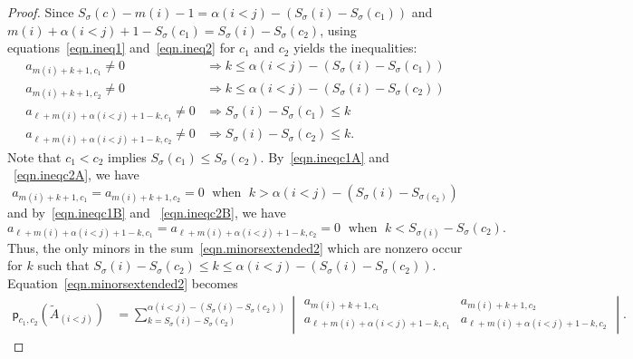 \documentclass[11pt]{amsart}
\theoremstyle{remark}
\theoremstyle{remark}
\theoremstyle{definition}
\theoremstyle{definition}
\theoremstyle{definition}
\numberwithin{equation}{section}
\newcommand{\gs}{\sigma}
\newcommand{\al}{\alpha}
\newcommand{\pl}{\mathsf{p}}
\newcommand{\mi}[1]{m(#1)}
\begin{document}
\begin{proof}
Since $S_\gs(c)-\mi{i}-1 = \al(i<j) - \left( S_\gs(i) - S_\gs(c_1) \right)$ and $\mi{i}+\al(i<j) +1 -S_\gs(c_1) = S_\gs(i)-S_{\gs}(c_2)$, using  equations~\eqref{eqn.ineq1} and~\eqref{eqn.ineq2} for $c_1$ and $c_2$ yields the inequalities:
\begin{align}
\label{eqn.ineqc1A} a_{\mi{i}+k+1, c_1} \neq 0 &\Rightarrow k \leq   \al(i<j) - \left(S_\gs(i)-S_\gs(c_1)\right) \\
\label{eqn.ineqc2A} a_{\mi{i}+k+1, c_2} \neq 0 &\Rightarrow k \leq   \al(i<j) - \left(S_\gs(i)-S_\gs(c_2)\right) \\
\label{eqn.ineqc1B} a_{\ell + \mi{i} + \al(i<j)+1-k,c_1} \neq 0 &\Rightarrow S_\gs(i)-S_\gs(c_1) \leq k \\
\label{eqn.ineqc2B} a_{\ell + \mi{i} + \al(i<j)+1-k,c_2} \neq 0 &\Rightarrow S_\gs(i)-S_\gs(c_2) \leq k .
\end{align}
Note that $c_1< c_2$ implies $S_\gs(c_1)\leq S_\gs(c_2)$. By~\eqref{eqn.ineqc1A} and ~\eqref{eqn.ineqc2A}, we have 
\[
a_{\mi{i}+k+1, c_1} = a_{\mi{i}+k+1, c_2} = 0 \; \text{ when } \; k > \al(i<j) - \left( S_\gs(i)-S_{\gs(c_2)} \right)
\]
and by~\eqref{eqn.ineqc1B} and ~\eqref{eqn.ineqc2B}, we have  
\[
a_{\ell + \mi{i} + \al(i<j)+1-k,c_1} = a_{\ell + \mi{i} + \al(i<j)+1-k,c_2} = 0 \; \text{ when } \; k< S_{\gs(i)} - S_\gs(c_2).
\]
Thus, the only minors in the sum~\eqref{eqn.minorsextended2} which are nonzero occur for $k$ such that $S_\gs(i)-S_\gs(c_2) \leq k \leq \al(i<j)- \left( S_\gs(i)-S_\gs(c_2) \right)$. Equation~\eqref{eqn.minorsextended2} becomes
\begin{align}\label{eqn.minorsextended3}
\pl_{c_1, c_2}(\widetilde A_{(i<j)}) & =  \sum_{k=S_\gs(i)-S_\gs(c_2)}^{\al(i<j) - \left( S_\gs(i)-S_\gs(c_2) \right)} \begin{vmatrix} a_{\mi{i}+k+1, c_1} & a_{\mi{i}+k+1, c_2}\\ a_{\ell+\mi{i}+\al(i<j) +1 - k, c_1} & a_{\ell+\mi{i}+\al(i<j) +1 - k, c_2}  \end{vmatrix}. 
\end{align}


\end{proof}
\end{document}
